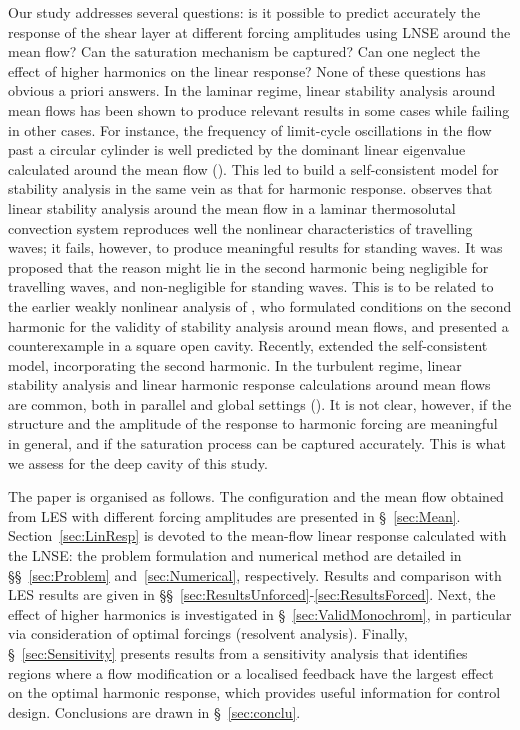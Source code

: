 \documentclass[11pt,onecolumn]{article}
\begin{document}
Our study addresses several questions:
is it possible to predict accurately the response of the shear layer at different forcing amplitudes using LNSE around the mean flow? 
Can the  saturation mechanism be captured?
Can one neglect the effect of higher harmonics on the linear response?
%
None of these questions has obvious a priori answers.
In the laminar regime, linear stability analysis around mean flows has been shown to produce relevant results in some cases while failing in other cases. 
For instance, the  frequency of limit-cycle oscillations in the flow past a circular cylinder is well predicted by the dominant linear eigenvalue calculated around the mean flow (\cite{Barkley06}). This led \cite{Mantic2014} to build a self-consistent model for stability analysis in the same vein as that for harmonic response. 
\cite{Turton15} observes that linear stability analysis around the mean flow in a laminar thermosolutal convection system reproduces well the nonlinear characteristics of travelling waves; it fails, however, to produce meaningful results for standing waves. It was proposed that the reason might lie in the second harmonic being negligible for travelling waves, and non-negligible for standing waves. 
This is to be related to the earlier weakly nonlinear analysis of \cite{Sipp2007}, who formulated conditions on the second harmonic for the validity of stability analysis around mean flows, and presented a counterexample in a square open cavity.
Recently, \cite{Meliga2017JFM} extended the self-consistent model, incorporating the second harmonic.
%
In the turbulent regime, linear stability analysis and linear harmonic response calculations around mean flows are common, both in parallel and global settings (\cite{DelAlamo06, Piot06, Pujals09, Hwang10, Marquillie11, Meliga12D, Iungo13, Gikadi14, 
Mettot14, 
Oberleithner2015, Beneddine2016, Edstrand2016, Tammi2016}). 
It is not clear, however, if the structure and the amplitude of the response to harmonic forcing are meaningful in general, and if the saturation process can be captured accurately. This is what we assess for the deep cavity of this study.

The paper is organised as follows.
The configuration and the mean flow obtained from LES with different forcing amplitudes are presented in \S~\ref{sec:Mean}.
Section~\ref{sec:LinResp} is devoted to the mean-flow linear response calculated with the LNSE: the problem formulation and numerical method are detailed in \S\S~\ref{sec:Problem} and~\ref{sec:Numerical}, respectively. Results and comparison with LES results are given in \S\S~\ref{sec:ResultsUnforced}-\ref{sec:ResultsForced}.
Next, the effect of higher harmonics is investigated in \S~\ref{sec:ValidMonochrom}, in particular via consideration of optimal forcings (resolvent analysis).
Finally, \S~\ref{sec:Sensitivity} presents 
results from a sensitivity analysis that identifies  regions where a flow modification or a localised feedback   have the largest effect on the optimal harmonic response, which provides useful information for control design.
Conclusions are drawn in \S~\ref{sec:conclu}.
\end{document}
